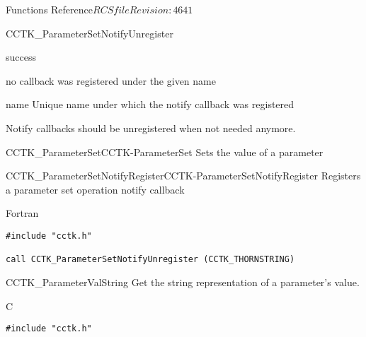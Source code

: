 \begin{cactuspart}{ Functions Reference}{$RCSfile$}{$Revision: 4641 $}
\begin{FunctionDescription}{CCTK\_ParameterSetNotifyUnregister}
\begin{ResultSection}
\begin{Result}{0}
success
\end{Result}
\begin{Result}{-1}
no callback was registered under the given name
\end{Result}
\end{ResultSection}

\begin{ParameterSection}
\begin{Parameter}{name}
Unique name under which the notify callback was registered
\end{Parameter}
\end{ParameterSection}

\begin{Discussion}
Notify callbacks should be unregistered when not needed anymore.
\end{Discussion}

\begin{SeeAlsoSection}
\begin{SeeAlso2}{CCTK\_ParameterSet}{CCTK-ParameterSet}
  Sets the value of a parameter
\end{SeeAlso2}
\begin{SeeAlso2}{CCTK\_ParameterSetNotifyRegister}{CCTK-ParameterSetNotifyRegister}
  Registers a parameter set operation notify callback
\end{SeeAlso2}
\end{SeeAlsoSection}

\begin{ExampleSection}
\begin{Example}{Fortran}
\begin{verbatim}
#include "cctk.h"

call CCTK_ParameterSetNotifyUnregister (CCTK_THORNSTRING)
\end{verbatim}
\end{Example}
\end{ExampleSection}
\end{FunctionDescription}


\begin{FunctionDescription}{CCTK\_ParameterValString}
\label{CCTK-ParameterValString}
Get the string representation of a parameter's value.

\begin{SynopsisSection}
\begin{Synopsis}{C}
\begin{verbatim}
#include "cctk.h"


\end{verbatim}
\end{Synopsis}
\end{SynopsisSection}
\end{FunctionDescription}
\end{cactuspart}
